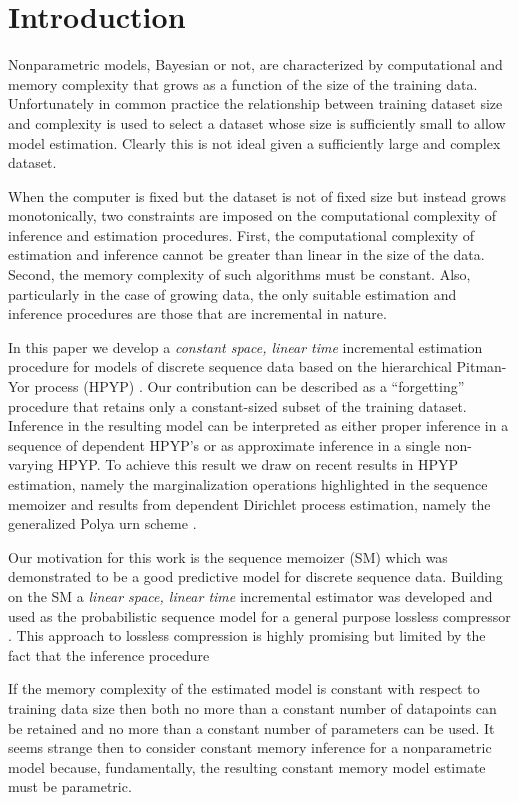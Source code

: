 \section{Introduction}

Nonparametric models, Bayesian or not, are characterized by computational and memory complexity that grows as a function of the size of the training data.  Unfortunately in common practice the relationship between training dataset size and complexity is used to select a dataset whose size is sufficiently small to allow model estimation.  Clearly this is not ideal given a sufficiently large and complex dataset.

When the computer is fixed but the dataset is not of fixed size but instead grows monotonically, two constraints are imposed on the computational complexity of inference and estimation procedures.  First, the computational complexity of estimation and inference cannot be greater than linear in the size of the data.  Second, the memory complexity of such algorithms must be constant.  Also, particularly in the case of growing data, the only suitable estimation and inference procedures are those that are incremental in nature.

In this paper we develop a {\em constant space, linear time} incremental estimation procedure for models of discrete sequence data based on the hierarchical Pitman-Yor process (HPYP) \cite{Teh2006a}.   Our contribution can be described as a ``forgetting'' procedure that retains only a constant-sized subset of the training dataset.  Inference in the resulting model can be interpreted as either proper inference in a sequence of dependent HPYP's or as approximate inference in a single non-varying HPYP.  To achieve this result we draw on recent results in HPYP estimation, namely the marginalization operations highlighted in the sequence memoizer \cite{Wood2009} and results from dependent Dirichlet process estimation, namely the generalized Polya urn scheme \cite{Caron2007}.  

Our motivation for this work is the sequence memoizer (SM) \cite{Wood2009} which was demonstrated to be a good predictive model for discrete sequence data.  Building on the SM a  {\em linear space, linear time} incremental estimator was developed and used as the probabilistic sequence model for a general purpose lossless compressor  \cite{Gasthaus2010}.   This approach to lossless compression is highly promising but limited by the fact that the inference procedure

If the memory complexity of the estimated model is constant with respect to training data size then both no more than a constant number of datapoints can be retained and no more than a constant number of parameters can be used.  It seems strange then to consider constant memory inference for a nonparametric model because, fundamentally, the resulting constant memory model estimate must be parametric.

